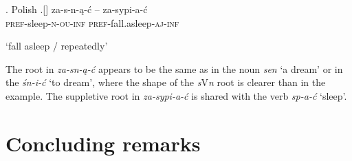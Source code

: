 \ex. Polish
\ag.[] \hspace{-22pt}za-s-n-\k{a}-\'c -- za-sypi-a-\'c\\
\hspace{-22pt}\textsc{pref}-sleep-\textsc{n-ou-inf} {} \textsc{pref}-fall.asleep-\textsc{aj-inf}\\
\hspace{-22pt}\strut  `fall asleep / repeatedly'

The root in \textit{za-sn-\k{a}-\'c} appears to be the same as in the noun \textit{sen} `a dream' or in the  \textit{\'sn-i-\'c} `to dream', where the shape of the  \textit{s}V\textit{n} root is clearer than in the  example. The suppletive root in \textit{za-sypi-a-\'c} is shared with the verb \textit{sp-a-\'c} `sleep'.

\section{Concluding remarks}


